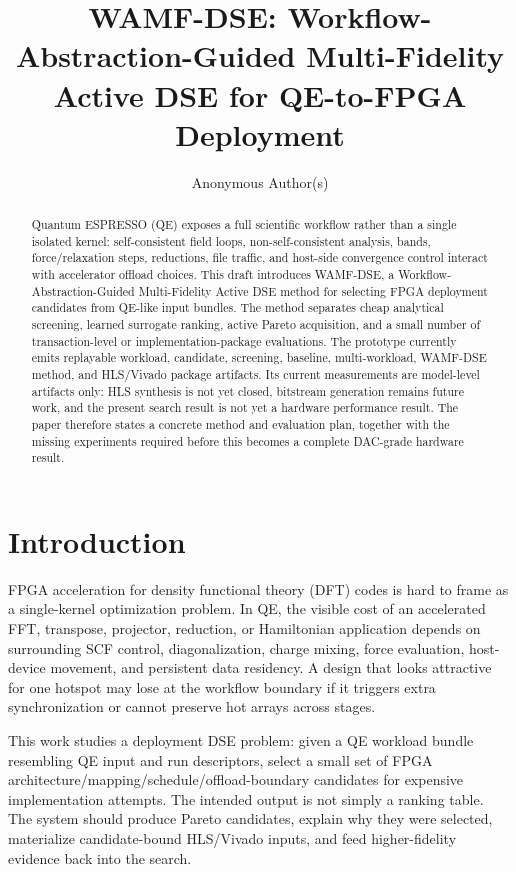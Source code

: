 \documentclass[sigconf,anonymous,review]{acmart}
\title{WAMF-DSE: Workflow-Abstraction-Guided Multi-Fidelity Active DSE for QE-to-FPGA Deployment}
\author{Anonymous Author(s)}
\affiliation{%
  \institution{Anonymous Institution}
  \city{Anonymous City}
  \country{Anonymous Country}}
\begin{document}
\begin{abstract}
Quantum ESPRESSO (QE) exposes a full scientific workflow rather than a single isolated kernel: self-consistent field loops, non-self-consistent analysis, bands, force/relaxation steps, reductions, file traffic, and host-side convergence control interact with accelerator offload choices.  This draft introduces WAMF-DSE, a Workflow-Abstraction-Guided Multi-Fidelity Active DSE method for selecting FPGA deployment candidates from QE-like input bundles.  The method separates cheap analytical screening, learned surrogate ranking, active Pareto acquisition, and a small number of transaction-level or implementation-package evaluations.  The prototype currently emits replayable workload, candidate, screening, baseline, multi-workload, WAMF-DSE method, and HLS/Vivado package artifacts.  Its current measurements are model-level artifacts only: HLS synthesis is not yet closed, bitstream generation remains future work, and the present search result is not yet a hardware performance result.  The paper therefore states a concrete method and evaluation plan, together with the missing experiments required before this becomes a complete DAC-grade hardware result.
\end{abstract}

\maketitle

\section{Introduction}

FPGA acceleration for density functional theory (DFT) codes is hard to frame as a single-kernel optimization problem.  In QE, the visible cost of an accelerated FFT, transpose, projector, reduction, or Hamiltonian application depends on surrounding SCF control, diagonalization, charge mixing, force evaluation, host-device movement, and persistent data residency.  A design that looks attractive for one hotspot may lose at the workflow boundary if it triggers extra synchronization or cannot preserve hot arrays across stages.

This work studies a deployment DSE problem: given a QE workload bundle resembling QE input and run descriptors, select a small set of FPGA architecture/mapping/schedule/offload-boundary candidates for expensive implementation attempts.  The intended output is not simply a ranking table.  The system should produce Pareto candidates, explain why they were selected, materialize candidate-bound HLS/Vivado inputs, and feed higher-fidelity evidence back into the search.
\end{document}
